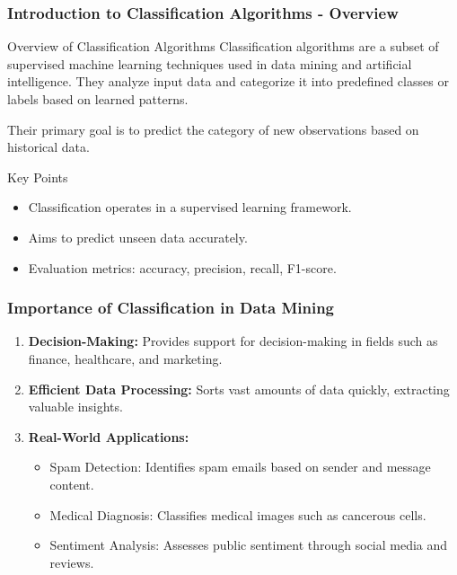 \documentclass[aspectratio=169]{beamer}
\begin{document}
\frame{\titlepage}

\begin{frame}[fragile]
    \frametitle{Introduction to Classification Algorithms - Overview}
    \begin{block}{Overview of Classification Algorithms}
        Classification algorithms are a subset of supervised machine learning techniques used in data mining and artificial intelligence. They analyze input data and categorize it into predefined classes or labels based on learned patterns.
    \end{block}
    Their primary goal is to predict the category of new observations based on historical data.

    \begin{block}{Key Points}
        \begin{itemize}
            \item Classification operates in a supervised learning framework.
            \item Aims to predict unseen data accurately.
            \item Evaluation metrics: accuracy, precision, recall, F1-score.
        \end{itemize}
    \end{block}
\end{frame}

\begin{frame}[fragile]
    \frametitle{Importance of Classification in Data Mining}
    \begin{enumerate}
        \item \textbf{Decision-Making:} Provides support for decision-making in fields such as finance, healthcare, and marketing. 
        \item \textbf{Efficient Data Processing:} Sorts vast amounts of data quickly, extracting valuable insights.
        \item \textbf{Real-World Applications:}
            \begin{itemize}
                \item Spam Detection: Identifies spam emails based on sender and message content.
                \item Medical Diagnosis: Classifies medical images such as cancerous cells.
                \item Sentiment Analysis: Assesses public sentiment through social media and reviews.
            \end{itemize}
    \end{enumerate}
\end{frame}
\end{document}
